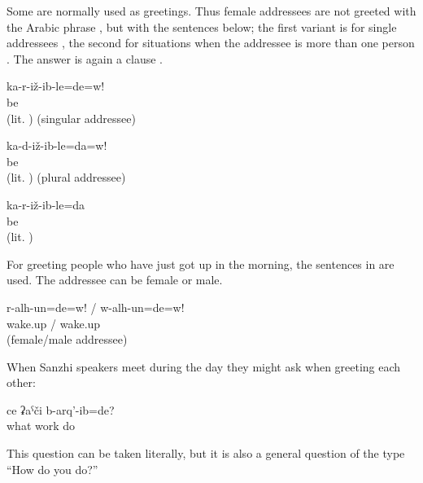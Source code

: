 Some  are normally used as greetings. Thus female addressees are not greeted with the Arabic phrase , but with the sentences below; the first variant is for single addressees , the second for situations when the addressee is more than one person . The answer is again a clause .

\begin{exe}
	\ex	\label{ex:Are you sitting? I am sitting}
	\begin{xlist}
		\ex	\label{ex:Are you sitting? I am sitting@A}
		\gll	ka-r-iž-ib-le=de=w!	\\
			be		\\
		\glt	{} (lit. ) (singular addressee)

		\ex	\label{ex:Are you sitting? I am sitting@C}
		\gll		ka-d-iž-ib-le=da=w!\\
			 be	\\
		\glt	{} (lit. ) (plural addressee)
		
		\ex	\label{ex:Are you sitting? I am sitting@B}
		\gll	ka-r-iž-ib-le=da\\
			be\\
		\glt	{} (lit. )
	\end{xlist}
\end{exe}

For greeting people who have just got up in the morning, the sentences in  are used. The addressee can be female or male.

\begin{exe}
	\ex	\label{ex:Good morning}
	\gll	r-alh-un=de=w!	/	w-alh-un=de=w!\\
		wake.up	/	wake.up\\
	\glt	{} (female\slash male addressee)
\end{exe}

When Sanzhi speakers meet during the day they might ask when greeting each other:

\begin{exe}
	\ex	\label{ex:What (work) have you done?}
	\gll	ce	ʡaˁči	b-arq'-ib=de?\\
		what	work	do\\
	\glt	{}
\end{exe}

This question can be taken literally, but it is also a general question of the type ``How do you do?''

